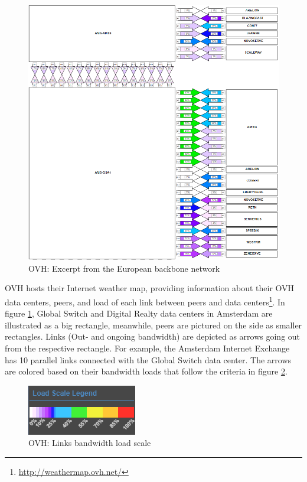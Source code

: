 \documentclass[sigconf,authorversion,nonacm]{acmart}
\begin{document}
\begin{figure}[H]
    \centering
    \includegraphics[width=\linewidth]{ovh.png}
    \caption{OVH: Excerpt from the European backbone network}
    \label{OVH: Excerpt from the European backbone network}
\end{figure}
OVH hosts their Internet weather map, providing information about their OVH data centers, peers, and load of each link between peers and data centers\footnote{\url{http://weathermap.ovh.net/}}. In figure \ref{OVH: Excerpt from the European backbone network}, Global Switch and Digital Realty data centers in Amsterdam are illustrated as a big rectangle, meanwhile, peers are pictured on the side as smaller rectangles. Links (Out- and ongoing bandwidth) are depicted as arrows going out from the respective rectangle. For example, the Amsterdam Internet Exchange has 10 parallel links connected with the Global Switch data center. The arrows are colored based on their bandwidth loads that follow the criteria in figure \ref{OVH: Links bandwidth load scale}.
\begin{figure}[H]
    \centering
    \includegraphics{scale.png}
    \caption{OVH: Links bandwidth load scale}
    \label{OVH: Links bandwidth load scale}
\end{figure}
\end{document}
